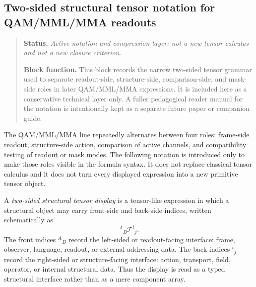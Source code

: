 %
%

\subsection*{Two-sided structural tensor notation for QAM/MML/MMA readouts}
\begin{quote}\small
\noindent\textbf{Status.} \emph{Active notation and compression layer; not a new tensor calculus and not a new closure criterion.}\par
\noindent\textbf{Block function.} This block records the narrow two-sided tensor grammar used to separate readout-side, structure-side, comparison-side, and mask-side roles in later QAM/MML/MMA expressions. It is included here as a conservative technical layer only. A fuller pedagogical reader manual for the notation is intentionally kept as a separate future paper or companion guide.
\end{quote}

The QAM/MML/MMA line repeatedly alternates between four roles: frame-side readout, structure-side action, comparison of active channels, and compatibility testing of readout or mask modes. The following notation is introduced only to make those roles visible in the formula syntax. It does not replace classical tensor calculus and it does not turn every displayed expression into a new primitive tensor object.

\begin{definition}\label{def:two-sided-structural-tensor-interface}
A \emph{two-sided structural tensor display} is a tensor-like expression in which a structural object may carry front-side and back-side indices, written schematically as
\[
{}^{A}{}_{B}\mathcal{T}^{i}{}_{j}.
\]
The front indices \({}^{A}{}_{B}\) record the left-sided or readout-facing interface: frame, observer, language, readout, or external addressing data. The back indices \({}^{i}{}_{j}\) record the right-sided or structure-facing interface: action, transport, field, operator, or internal structural data. Thus the display is read as a typed structural interface rather than as a mere component array.
\end{definition}

